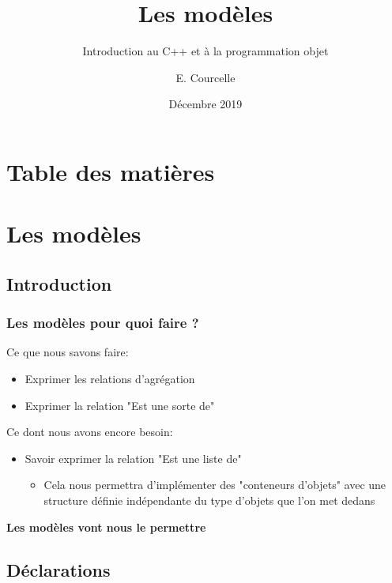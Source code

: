 \documentclass{beamer}
\title{Les modèles}
\subtitle{Introduction au C++ et à la programmation objet}
\author{E. Courcelle}\institute{CALMIP, URA 3667}
\date{Décembre 2019}
\begin{document}
\begin{frame}
\titlepage
\end{frame}

\section*{Table des matières}
\begin{frame}
\tableofcontents
\end{frame}


\section{Les modèles}

\subsection{Introduction}

\begin{frame}[fragile=singleslide,shrink=20]
\frametitle {Les modèles pour quoi faire ?}

Ce que nous savons faire:
\begin{itemize}
\item{Exprimer les relations d'agrégation}
\item{Exprimer la relation "Est une sorte de"}
\end{itemize}

Ce dont nous avons encore besoin:
\begin{itemize}
\item{Savoir exprimer la relation "Est une liste de"}
\begin{itemize}
\item{Cela nous permettra d'implémenter des "conteneurs d'objets" avec une structure définie indépendante du type d'objets que l'on met dedans}
\end{itemize}
\end{itemize}

\textbf{Les modèles vont nous le permettre}
\end{frame}

\subsection{Déclarations}
\end{document}
